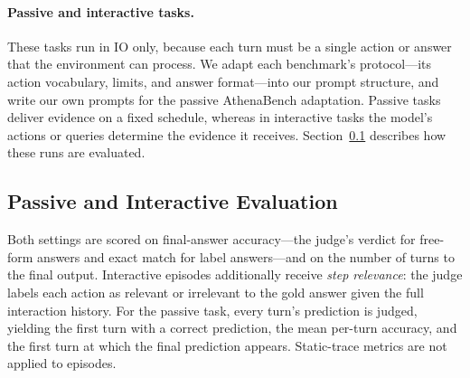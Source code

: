 \paragraph{Passive and interactive tasks.}
These tasks run in IO only, because each turn must be a single action or answer that the environment can process. We adapt each benchmark's protocol---its action vocabulary, limits, and answer format---into our prompt structure, and write our own prompts for the passive AthenaBench adaptation. Passive tasks deliver evidence on a fixed schedule, whereas in interactive tasks the model's actions or queries determine the evidence it receives. Section~\ref{sec:sequential_interactive_evaluation} describes how these runs are evaluated.


\subsection{Passive and Interactive Evaluation}
\label{sec:sequential_interactive_evaluation}

Both settings are scored on final-answer accuracy---the judge's verdict for free-form answers and exact match for label answers---and on the number of turns to the final output. Interactive episodes additionally receive \emph{step relevance}: the judge labels each action as relevant or irrelevant to the gold answer given the full interaction history. For the passive task, every turn's prediction is judged, yielding the first turn with a correct prediction, the mean per-turn accuracy, and the first turn at which the final prediction appears. Static-trace metrics are not applied to episodes.




